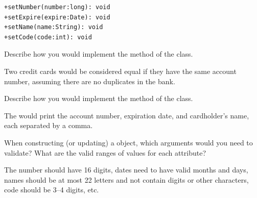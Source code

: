 \begin{answer}[5em]
\begin{verbatim}
+setNumber(number:long): void
+setExpire(expire:Date): void
+setName(name:String): void
+setCode(code:int): void
\end{verbatim}
\end{answer}


\Q Describe how you would implement the  method of the  class.

\begin{answer}
Two credit cards would be considered equal if they have the same account number, assuming there are no duplicates in the bank.
\end{answer}


\Q Describe how you would implement the  method of the  class.

\begin{answer}
The  would print the account number, expiration date, and cardholder's name, each separated by a comma.
\end{answer}


\Q When constructing (or updating) a  object, which arguments would you need to validate?
What are the valid ranges of values for each attribute?

\begin{answer}[5em]
The number should have 16 digits, dates need to have valid months and days, names should be at most 22 letters and not contain digits or other characters, code should be 3--4 digits, etc.
\end{answer}
